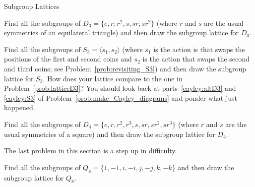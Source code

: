 \begin{section}{Subgroup Lattices}
\begin{problem}\label{prob:latticeD3}
Find all the subgroups of $D_3=\{e,r,r^2,s,sr,sr^2\}$ (where $r$ and $s$ are the usual symmetries of an equilateral triangle) and then draw the subgroup lattice for $D_3$.
\end{problem}

\begin{problem}
Find all the subgroups of $S_3=\langle s_1, s_2\rangle$ (where $s_1$ is the action is that swaps the positions of the first and second coins and $s_2$ is the action that swaps the second and third coins; see Problem~\ref{prob:revisiting_S3}) and then draw the subgroup lattice for $S_3$. How does your lattice compare to the one in Problem~\ref{prob:latticeD3}? You should look back at parts~\ref{cayley:altD3} and \ref{cayley:S3} of Problem~\ref{prob:make_Cayley_diagrams} and ponder what just happened.
\end{problem}

\begin{problem}
Find all the subgroups of $D_4=\{e,r,r^2,r^3,s,sr,sr^2,sr^3\}$ (where $r$ and $s$ are the usual symmetries of a square) and then draw the subgroup lattice for $D_4$.
\end{problem}

The last problem in this section is a step up in difficulty.

\begin{problem}
Find all the subgroups of $Q_8=\{1,-1,i,-i,j,-j,k,-k\}$ and then draw the subgroup lattice for $Q_8$.
\end{problem}

\end{section}


